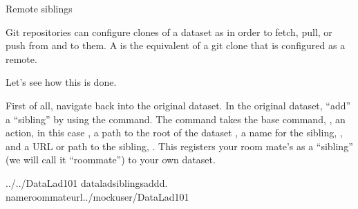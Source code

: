 \ignorespaces \begin{gitusernote}[label={index-1}, before title={\thetcbcounter\ }, check odd page=true]{Remote siblings}
\label{\detokenize{basics/101-121-siblings:index-1}}

\sphinxAtStartPar
Git repositories can configure clones of a dataset as  in
order to fetch, pull, or push from and to them. A 
is the equivalent of a git clone that is configured as a remote.


\end{gitusernote}

\sphinxAtStartPar
Let’s see how this is done.

\ignorespaces 
\sphinxAtStartPar
First of all, navigate back into the original dataset.
In the original dataset, “add” a “sibling” by using
the  command.
The command takes the base command,
, an action, in this case , a path to the
root of the dataset , a name for the sibling, ,
and a URL or path to the sibling, .
This registers your room mate’s  as a “sibling” (we will call it
“roommate”) to your own  dataset.

\begin{sphinxVerbatim}[commandchars=\\\{\}]
../../DataLad\PYGZhy{}101
dataladsiblingsadd\PYGZhy{}d.
\PYGZhy{}\PYGZhy{}nameroommate\PYGZhy{}\PYGZhy{}url../mock\PYGZus{}user/DataLad\PYGZhy{}101
\end{sphinxVerbatim}

